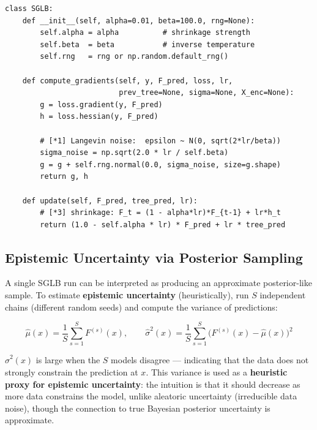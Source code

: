 \documentclass[11pt, a4paper]{article}
\begin{document}
\begin{listing}[H]
\caption{SGLB gradient and update (\texttt{boosting.py})}
\begin{verbatim}
class SGLB:
    def __init__(self, alpha=0.01, beta=100.0, rng=None):
        self.alpha = alpha          # shrinkage strength
        self.beta  = beta           # inverse temperature
        self.rng   = rng or np.random.default_rng()

    def compute_gradients(self, y, F_pred, loss, lr,
                          prev_tree=None, sigma=None, X_enc=None):
        g = loss.gradient(y, F_pred)
        h = loss.hessian(y, F_pred)

        # [*1] Langevin noise:  epsilon ~ N(0, sqrt(2*lr/beta))
        sigma_noise = np.sqrt(2.0 * lr / self.beta)
        g = g + self.rng.normal(0.0, sigma_noise, size=g.shape)
        return g, h

    def update(self, F_pred, tree_pred, lr):
        # [*3] shrinkage: F_t = (1 - alpha*lr)*F_{t-1} + lr*h_t
        return (1.0 - self.alpha * lr) * F_pred + lr * tree_pred
\end{verbatim}
\end{listing}

\subsection{Epistemic Uncertainty via Posterior Sampling}

A single SGLB run can be interpreted as producing an approximate
posterior-like sample.
To estimate \textbf{epistemic uncertainty} (heuristically), run $S$ independent
chains (different random seeds) and compute the variance of predictions:

\[
\hat{\mu}(x) = \frac{1}{S}\sum_{s=1}^S F^{(s)}(x), \qquad
\hat{\sigma}^2(x) = \frac{1}{S}\sum_{s=1}^S \bigl(F^{(s)}(x) - \hat{\mu}(x)\bigr)^2
\]

$\hat{\sigma}^2(x)$ is large when the $S$ models disagree --- indicating
that the data does not strongly constrain the prediction at $x$.
This variance is used as a \textbf{heuristic proxy for epistemic uncertainty}:
the intuition is that it should decrease as more data constrains the model,
unlike aleatoric uncertainty (irreducible data noise), though the connection
to true Bayesian posterior uncertainty is approximate.
\end{document}
